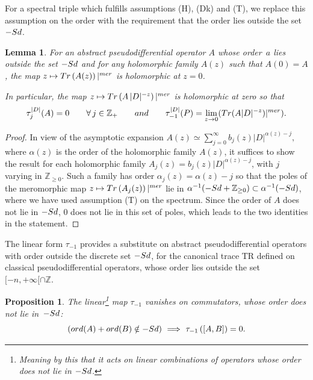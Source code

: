 \documentclass[11pt]{article}
\newtheorem{lemma}{Lemma}
\newtheorem{proposition}{Proposition}
\def \Z {\mathbb Z}
\numberwithin{equation}{section}
\begin{document}
For a spectral triple which fulf\/ills assumptions (H), (Dk) and (T), we replace
this  assumption on the order  with the requirement that the
order lies outside the set $-{\rm Sd}$.

\begin{lemma} For an abstract pseudodifferential  operator $A$ whose order~$a$ lies outside the set $ -{\rm Sd}$  and for any
  holomorphic family $A(z)$ such that $A(0)=A$,
 the map $z\mapsto {\rm Tr} \left( A(z) \right)\vert^{\rm mer}$ is holomorphic at
  $z=0$.

 In particular,  the map $z\mapsto  {\rm
    Tr} \left( A\, \vert D\vert^{-z}\right)\vert^{\rm mer} $ is holomorphic at
  zero so that
  \[
  \tau_j^{\vert D\vert}(A)=0\qquad \forall\, j\in \Z_+\qquad {\rm and}\qquad \tau_{-1}^{\vert D\vert} (P)=\lim_{z\to 0} ({\rm
    Tr}  ( A \vert D\vert^{-z} )\vert^{\rm mer} ).
    \]
\end{lemma}
\begin{proof} In view of the asymptotic expansion $A(z)\simeq \sum\limits_{j=0}^\infty
b_j (z)\vert D\vert^{\alpha(z)-j},$
where   $\alpha(z)$ is the  order of the holomorphic family $A(z)$,
it suf\/f\/ices to show the result for each holomorphic family $A_j(z)= b_j(z)
\vert D\vert^{\alpha(z)-j}$, with $j$ varying in $\Z_{\geq 0}$.
Such a family  has order $\alpha_j(z)= \alpha(z)-j$ so that the  poles of the meromorphic map $z\mapsto {\rm
    Tr} \left( A_j(z) \right)\vert^{\rm mer}$  lie in
  $\alpha^{-1}(-{\rm Sd}+\Z_{\geq 0})\subset \alpha^{-1}(-{\rm Sd})$, where we have used
  assumption (T) on the spectrum.
 Since    the order of $A$ does not lie in $-{\rm Sd}$, $0$ does not lie in this set of
poles, which leads to the two identities in the statement.\end{proof}
\setcounter{section}{7}
\setcounter{subsection}{0}
\setcounter{subsubsection}{0}
\setcounter{equation}{0}
\setcounter{proposition}{6}
\setcounter{footnote}{7}
The linear form $\tau_{-1}$  provides a substitute on
abstract pseudodif\/ferential operators with order outside the discrete set $-{\rm Sd}$, for the canonical trace TR
def\/ined on classical pseudodif\/ferential
operators, whose order lies outside  the set $[{-}n,+\infty[\cap \Z$.
\begin{proposition}\label{proposition7}
The linear\footnote{Meaning by this that it acts on  linear
  combinations of operators whose order does not lie in $-{\rm Sd}$.}  map
$\tau_{-1}$  vanishes on  commutators, whose order does not  lie in~$-{\rm Sd}$:
\[
\left({\rm ord}(A)+{\rm ord}(B)\notin -{\rm Sd}\right) \ \Longrightarrow \
\tau_{-1}\left([A,B]\right)=0.
\]
\end{proposition}
\end{document}
